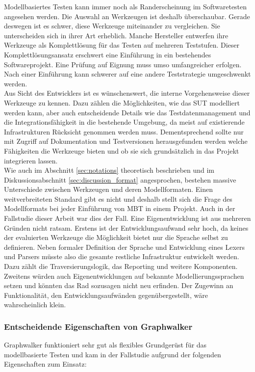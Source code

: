 Modellbasiertes Testen kann immer noch als Randerscheinung im Softwaretesten angesehen werden. Die Auswahl an Werkzeugen ist deshalb überschaubar. Gerade deswegen ist es schwer, diese Werkzeuge miteinander zu vergleichen. Sie unterscheiden sich in ihrer Art erheblich. Manche Hersteller entwerfen ihre Werkzeuge als Komplettlösung für das Testen auf mehreren Teststufen. Dieser Komplettlösungsansatz erschwert eine Einführung in ein bestehendes Softwareprojekt. Eine Prüfung auf Eignung muss umso umfangreicher erfolgen. Nach einer Einführung kann schwerer auf eine andere Teststrategie umgeschwenkt werden.\\
Aus Sicht des Entwicklers ist es wünschenswert, die interne Vorgehensweise dieser Werkzeuge zu kennen. Dazu zählen die Möglichkeiten, wie das \Gls{SUT} modelliert werden kann, aber auch entscheidende Details wie das Testdatenmanagement und die Integrationsfähigkeit in die bestehende Umgebung, da meist auf existierende Infrastrukturen Rücksicht genommen werden muss. Dementsprechend sollte nur mit Zugriff auf Dokumentation und Testversionen herausgefunden werden welche Fähigkeiten die Werkzeuge bieten und ob sie sich grundsätzlich in das Projekt integrieren lassen.\\
Wie auch im Abschnitt \ref{sec:notations} theoretisch beschrieben und im Diskussionsabschnitt \ref{sec:discussion_format} angesprochen, bestehen massive Unterschiede zwischen Werkzeugen und deren Modellformaten. Einen weitverbreiteten Standard gibt es nicht und deshalb stellt sich die Frage des Modellformats bei jeder Einführung von \Gls{MBT} in einem Projekt. Auch in der Fallstudie dieser Arbeit war dies der Fall. Eine Eigenentwicklung ist aus mehreren Gründen nicht ratsam. Erstens ist der Entwicklungsaufwand sehr hoch, da keines der evaluierten Werkzeuge die Möglichkeit bietet nur die Sprache selbst zu definieren. Neben formaler Definition der Sprache und Entwicklung eines Lexers und Parsers müsste also die gesamte restliche Infrastruktur entwickelt werden. Dazu zählt die Traversierungslogik, das Reporting und weitere Komponenten. Zweitens würden auch Eigenentwicklungen auf bekannte Modellierungssprachen setzen und könnten das Rad sozusagen nicht neu erfinden. Der Zugewinn an Funktionalität, den Entwicklungsaufwänden gegenübergestellt, wäre wahrscheinlich klein.\\


\subsubsection{Entscheidende Eigenschaften von Graphwalker}
Graphwalker funktioniert sehr gut als flexibles Grundgerüst für das modellbasierte Testen und kam in der Fallstudie aufgrund der folgenden Eigenschaften zum Einsatz:

